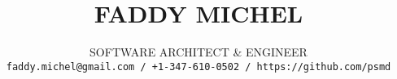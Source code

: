 \title{\uppercase{Faddy Michel}}
\author{\uppercase{Software Architect \& Engineer}\\
\texttt{faddy.michel@gmail.com / +1-347-610-0502 / https://github.com/psmd}}
\date{}
\maketitle

